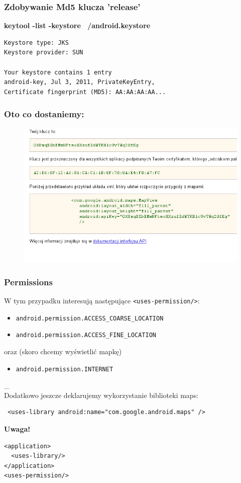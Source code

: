 \documentclass{beamer}
\begin{document}
\begin{frame}[fragile]\frametitle{Zdobywanie Md5 klucza 'release'}

\textbf{keytool -list -keystore ~/android.keystore }

\begin{lstlisting}
Keystore type: JKS
Keystore provider: SUN

Your keystore contains 1 entry
android-key, Jul 3, 2011, PrivateKeyEntry, 
Certificate fingerprint (MD5): AA:AA:AA:AA...
\end{lstlisting}

\end{frame}


\begin{frame}\frametitle{Oto co dostaniemy:}
\begin{figure}
 \centering
 \includegraphics[width=\textwidth,keepaspectratio=true]{images/maps_get_key}
\end{figure} 
\end{frame}


\begin{frame}[fragile]\frametitle{Permissions}

W tym przypadku interesują następujące \verb|<uses-permission/>|:

\begin{itemize}
 \item \verb|android.permission.ACCESS_COARSE_LOCATION|
 \item \verb|android.permission.ACCESS_FINE_LOCATION|
\end{itemize}

oraz (skoro chcemy wyświetlić mapkę)
\begin{itemize}
 \item \verb|android.permission.INTERNET|
\end{itemize}

\pause
_\\
Dodatkowo jeszcze deklarujemy wykorzystanie biblioteki maps:
\begin{verbatim}
 <uses-library android:name="com.google.android.maps" />
\end{verbatim}

\textbf{Uwaga!}
\begin{lstlisting}
<application>
  <uses-library/> 
</application>
<uses-permission/>
\end{lstlisting}

\end{frame}
\end{document}
